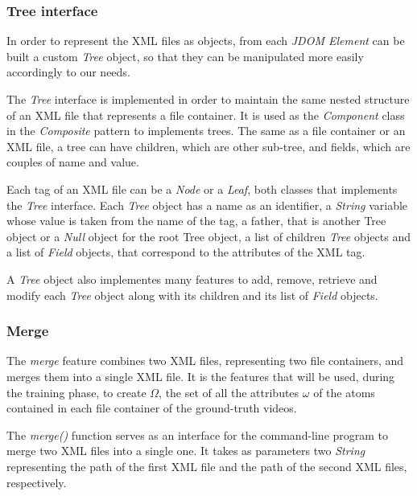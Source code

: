 \subsubsection*{Tree interface}

In order to represent the XML files as objects, from each \emph{JDOM Element} can be built a custom \emph{Tree} object, so that they can be manipulated more easily accordingly to our needs.

The \emph{Tree} interface is implemented in order to maintain the same nested structure of an XML file that represents a file container. It is used as the \emph{Component} class in the \emph{Composite} pattern to implements trees. The same as a file container or an XML file, a tree can have children, which are other sub-tree, and fields, which are couples of name and value.

Each tag of an XML file can be a \emph{Node} or a \emph{Leaf}, both classes that implements the \emph{Tree} interface. Each \emph{Tree} object has a name as an identifier, a \emph{String} variable whose value is taken from the name of the tag, a father, that is another Tree object or a \emph{Null} object for the root Tree object, a list of children \emph{Tree} objects and a list of \emph{Field} objects, that correspond to the attributes of the XML tag.

A \emph{Tree} object also implementes many features to add, remove, retrieve and modify each \emph{Tree} object along with its children and its list of \emph{Field} objects.

\subsubsection*{Merge}

The \emph{merge} feature combines two XML files, representing two file containers, and merges them into a single XML file. It is the features that will be used, during the training phase, to create $\Omega$, the set of all the attributes $\omega$ of the atoms contained in each file container of the ground-truth videos.

The \emph{merge()} function serves as an interface for the command-line program to merge two XML files into a single one. It takes as parameters two \emph{String} representing the path of the first XML file and the path of the second XML files, respectively.

